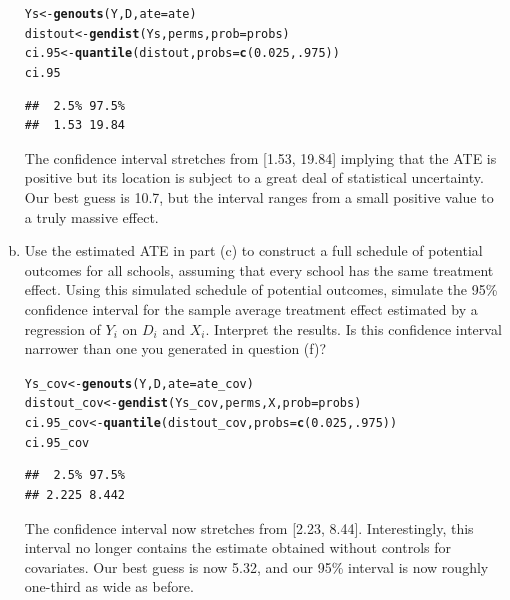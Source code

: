 \documentclass[11pt,notitlepage]{article}\usepackage[]{graphicx}\usepackage[]{color}
\makeatletter
\newcommand{\hlnum}[1]{\textcolor[rgb]{0.686,0.059,0.569}{#1}}%
\newcommand{\hlstd}[1]{\textcolor[rgb]{0.345,0.345,0.345}{#1}}%
\newcommand{\hlkwb}[1]{\textcolor[rgb]{0.69,0.353,0.396}{#1}}%
\newcommand{\hlkwc}[1]{\textcolor[rgb]{0.333,0.667,0.333}{#1}}%
\newcommand{\hlkwd}[1]{\textcolor[rgb]{0.737,0.353,0.396}{\textbf{#1}}}%
\newenvironment{kframe}{%
 \def\at@end@of@kframe{}%
 \ifinner\ifhmode%
  \def\at@end@of@kframe{\end{minipage}}%
  \begin{minipage}{\columnwidth}%
 \fi\fi%
 \def\FrameCommand##1{\hskip\@totalleftmargin \hskip-\fboxsep
 \colorbox{shadecolor}{##1}\hskip-\fboxsep
     \hskip-\linewidth \hskip-\@totalleftmargin \hskip\columnwidth}%
 \MakeFramed {\advance\hsize-\width
   \@totalleftmargin\z@ \linewidth\hsize
   \@setminipage}}%
 {\par\unskip\endMakeFramed%
 \at@end@of@kframe}
\newenvironment{knitrout}{}{} %
\makeatother
\begin{document}
\begin{enumerate}[a)]
\begin{knitrout}
\color{fgcolor}\begin{kframe}
\begin{alltt}
\hlstd{Ys} \hlkwb{<-} \hlkwd{genouts}\hlstd{(Y,D,}\hlkwc{ate}\hlstd{=ate)}
\hlstd{distout} \hlkwb{<-} \hlkwd{gendist}\hlstd{(Ys,perms,}\hlkwc{prob}\hlstd{=probs)}
\hlstd{ci.95} \hlkwb{<-} \hlkwd{quantile}\hlstd{(distout,} \hlkwc{probs}\hlstd{=}\hlkwd{c}\hlstd{(}\hlnum{0.025}\hlstd{,} \hlnum{.975}\hlstd{))}
\hlstd{ci.95}
\end{alltt}
\begin{verbatim}
##  2.5% 97.5% 
##  1.53 19.84
\end{verbatim}
\end{kframe}
\end{knitrout}

The confidence interval stretches from [1.53, 19.84] implying that the ATE is positive but its location is subject to a great deal of statistical uncertainty.  Our best guess is 10.7, but the interval ranges from a small positive value to a truly massive effect.

\item Use the estimated ATE in part (c) to construct a full schedule of potential outcomes for all schools, assuming that every school has the same treatment effect.  Using this simulated schedule of potential outcomes, simulate the 95\% confidence interval for the sample average treatment effect estimated by a regression of $Y_i$ on $D_i$ and $X_i$.  Interpret the results.  Is this confidence interval narrower than one you generated in question (f)?  

\begin{knitrout}
\color{fgcolor}\begin{kframe}
\begin{alltt}
\hlstd{Ys_cov} \hlkwb{<-} \hlkwd{genouts}\hlstd{(Y,D,}\hlkwc{ate}\hlstd{=ate_cov)}
\hlstd{distout_cov} \hlkwb{<-} \hlkwd{gendist}\hlstd{(Ys_cov,perms,X,}\hlkwc{prob}\hlstd{=probs)}
\hlstd{ci.95_cov} \hlkwb{<-} \hlkwd{quantile}\hlstd{(distout_cov,} \hlkwc{probs}\hlstd{=}\hlkwd{c}\hlstd{(}\hlnum{0.025}\hlstd{,} \hlnum{.975}\hlstd{))}
\hlstd{ci.95_cov}
\end{alltt}
\begin{verbatim}
##  2.5% 97.5% 
## 2.225 8.442
\end{verbatim}
\end{kframe}
\end{knitrout}

The confidence interval now stretches from [2.23, 8.44].  Interestingly, this interval no longer contains the estimate obtained without controls for covariates.  Our best guess is now 5.32, and our 95\% interval is now roughly one-third as wide as before.

\end{enumerate}
\end{document}
